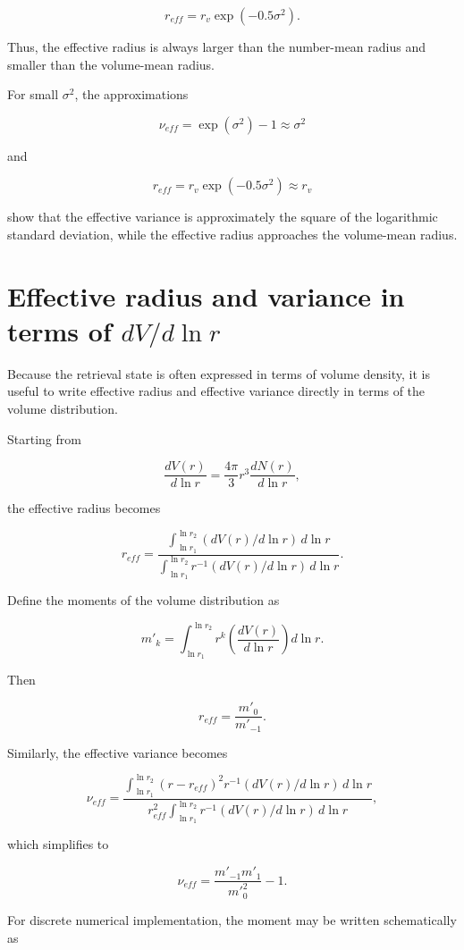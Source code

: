 \documentclass[
  11pt,
  letterpaper,
  DIV=11,
  numbers=noendperiod]{scrreprt}
\begin{document}
\[
r_{eff}=r_v \exp(-0.5 \sigma^2).
\]

Thus, the effective radius is always larger than the number-mean radius
and smaller than the volume-mean radius.

For small \(\sigma^2\), the approximations

\[
\nu_{eff}=\exp (\sigma^2)-1 \approx \sigma^2
\]

and

\[
r_{eff}= r_v \exp(-0.5 \sigma^2) \approx r_v
\]

show that the effective variance is approximately the square of the
logarithmic standard deviation, while the effective radius approaches
the volume-mean radius.

\section{\texorpdfstring{Effective radius and variance in terms of
\(dV/d\ln r\)}{Effective radius and variance in terms of dV/d\textbackslash ln r}}\label{effective-radius-and-variance-in-terms-of-dvdln-r}

Because the retrieval state is often expressed in terms of volume
density, it is useful to write effective radius and effective variance
directly in terms of the volume distribution.

Starting from

\[
\frac{d V(r)}{d \ln r}=\frac{4\pi}{3} r^3 \frac{d N(r)}{d \ln r},
\]

the effective radius becomes

\[
r_{eff}=\frac{\int_{\ln r_1}^{\ln r_2} (dV(r)/d\ln r) \, d\ln r}
{\int_{\ln r_1}^{\ln r_2} r^{-1} (dV(r)/d\ln r) \, d\ln r}.
\]

Define the moments of the volume distribution as

\[
m'_k = \int_{\ln r_1}^{\ln r_2} r^k \left(\frac{dV(r)}{d\ln r}\right) d\ln r.
\]

Then

\[
r_{eff}= \frac{m'_0}{m'_{-1}}.
\]

Similarly, the effective variance becomes

\[
\nu_{eff}=\frac{\int_{\ln r_1}^{\ln r_2}(r-r_{eff})^2 r^{-1} (dV(r)/d\ln r) \, d\ln r}
{r^2_{eff} \int_{\ln r_1}^{\ln r_2} r^{-1} (dV(r)/d\ln r) \, d\ln r},
\]

which simplifies to

\[
\nu_{eff}= \frac{m'_{-1} m'_1}{m'^2_0}-1.
\]

For discrete numerical implementation, the moment may be written
schematically as
\end{document}
